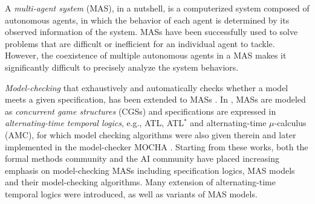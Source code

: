 \documentclass[letterpaper]{article}
\newcommand{\pamc}{{pAMC}\xspace}
\newcommand{\pamcs}{{pAMC$_0$}\xspace}
\newcommand{\pamcc}{{pAMC$_1$}\xspace}
\begin{document}


A \emph{multi-agent system} (MAS), in a nutshell, is a computerized system composed of autonomous agents, in which the
behavior of each agent is determined by its observed information of the system.
MASs have been successfully used to solve problems that are difficult or inefficient for an individual agent to
tackle. However, the coexistence of multiple autonomous agents in a MAS makes
it significantly difficult to precisely analyze the system behaviors.

\emph{Model-checking} that exhaustively and automatically checks whether a model meets a given specification, has been extended to MASs \cite{AHK02}.
In \cite{AHK02}, MASs are modeled as \emph{concurrent game structures} (CGSs) and specifications are expressed in \emph{alternating-time temporal logics}, e.g., ATL, ATL$^*$ and alternating-time $\mu$-calculus (AMC), for which model checking algorithms were also given therein and later implemented in the model-checker MOCHA \cite{AHMQRT98}.
Starting from these works, both the formal methods community and the AI community have placed increasing emphasis on model-checking MASs including specification logics, MAS models and their model-checking algorithms.
Many extension of alternating-time temporal logics were introduced, as well as variants of MAS models.
\end{document}
